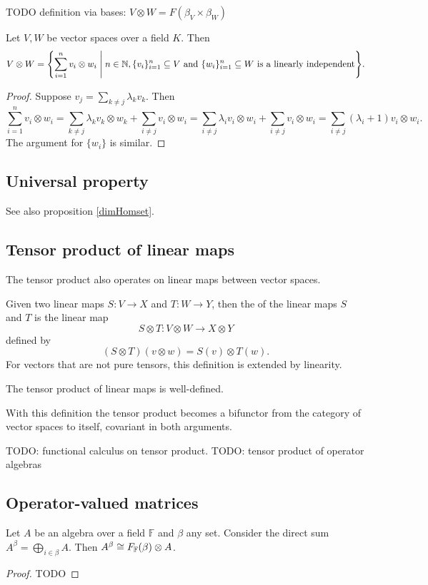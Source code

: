 TODO definition via bases: $V\otimes W = F(\beta_V\times \beta_W)$

\begin{lemma} \label{tensorProductLinearlyIndependentBasis}
Let $V,W$ be vector spaces over a field $K$. Then
\[ V\otimes W = \setbuilder{\sum_{i=1}^n v_i\otimes w_i}{n\in \N, \text{$\{v_i\}_{i=1}^n\subseteq V$ and $\{w_i\}_{i=1}^n\subseteq W$ is a linearly independent}}. \]
\end{lemma}
\begin{proof}
Suppose $v_{j} = \sum_{k\neq j}\lambda_kv_k$. Then 
\[ \sum_{i=1}^n v_i\otimes w_i = \sum_{k\neq j}\lambda_kv_k\otimes w_k + \sum_{i\neq j} v_i\otimes w_i = \sum_{i\neq j}\lambda_iv_i\otimes w_i + \sum_{i\neq j} v_i\otimes w_i = \sum_{i\neq j} (\lambda_i+1)v_i\otimes w_i. \]
The argument for $\{w_i\}$ is similar.
\end{proof}

\subsection{Universal property}
See also proposition \ref{dimHomset}.


\subsection{Tensor product of linear maps}
The tensor product also operates on linear maps between vector spaces.
\begin{definition}
Given two linear maps $S: V\to X$ and $T:W\to Y$, then the  of the linear maps $S$ and $T$ is the linear map
\[ S\otimes T: V\otimes W \to X\otimes Y \]
defined by
\[ (S\otimes T)(v\otimes w) = S(v)\otimes T(w). \]
For vectors that are not pure tensors, this definition is extended by linearity.
\end{definition}
\begin{lemma}
The tensor product of linear maps is well-defined.
\end{lemma}

With this definition the tensor product becomes a bifunctor from the category of vector spaces to itself, covariant in both arguments.

TODO: functional calculus on tensor product.
TODO: tensor product of operator algebras


\subsection{Operator-valued matrices}
\begin{proposition}
Let $A$ be an algebra over a field $\mathbb{F}$ and $\beta$ any set. Consider the direct sum $A^\beta = \bigoplus_{i\in\beta}A$. Then $A^\beta \cong F_{\mathbb{F}}(\beta)\otimes A$.
\end{proposition}
\begin{proof}
TODO
\end{proof}


